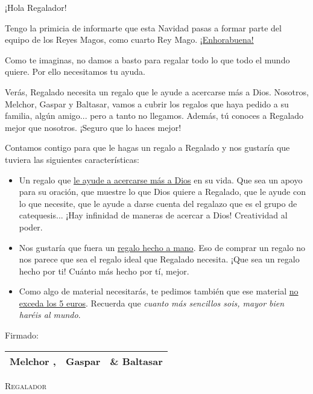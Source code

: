 \documentclass[11pt]{article}
\DeclareRobustCommand{\augiefamily}{%
  \fontfamily{augie}\fontseries{m}\fontshape{n}\selectfont}
\newcommand{\receiver}{Regalado\xspace}
\newcommand{\giver}{Regalador\xspace}
\begin{document}
\bsifamily


\large



¡Hola \giver!

Tengo la primicia de informarte que esta Navidad pasas a formar parte del equipo de los Reyes Magos, como cuarto Rey Mago. \ul{¡Enhorabuena!}

Como te imaginas, no damos a basto para regalar todo lo que todo el mundo quiere. Por ello necesitamos tu ayuda. 

Verás, \LARGE{\receiver} \large necesita un regalo que le ayude a acercarse más a Dios.
%
Nosotros, Melchor, Gaspar y Baltasar, vamos a cubrir los regalos que haya pedido a su familia, algún amigo... pero a tanto no llegamos. Además, tú conoces a \receiver mejor que nosotros. ¡Seguro que lo haces mejor!

Contamos contigo para que le hagas un regalo a \receiver y nos gustaría que tuviera las siguientes características:

\vspace{-1em}
\begin{itemize}
	\item Un regalo que \ul{le ayude a acercarse más a Dios} en su vida. 
	Que sea un apoyo para su oración, que muestre lo que Dios quiere a \receiver, que le ayude con lo que necesite, que le ayude a darse cuenta del regalazo que es el grupo de catequesis... ¡Hay infinidad de maneras de acercar a Dios! Creatividad al poder.

	\item Nos gustaría que fuera un \ul{regalo hecho a mano}. Eso de comprar un regalo no nos parece que sea el regalo ideal que \receiver necesita. 
	¡Que sea un regalo hecho por ti! Cuánto más hecho por tí, mejor.
	\item Como algo de material necesitarás, te pedimos también que ese material \ul{no exceda los 5 euros}.
	Recuerda que \textit{cuanto más sencillos sois, mayor bien haréis al mundo}.
\end{itemize}

Firmado:

\begin{center}
\begin{tabular}{ccc}
\augiefamily Melchor ,& \augiefamily Gaspar &  \augiefamily \& Baltasar\\\hline
\end{tabular}
\end{center}

\newpage


\Fontauri\bfseries\slshape


\vspace*{\fill}
\begin{center}
{\fontsize{65}{130}\textsc{\giver}}
\end{center}
\vspace*{\fill}
\end{document}
